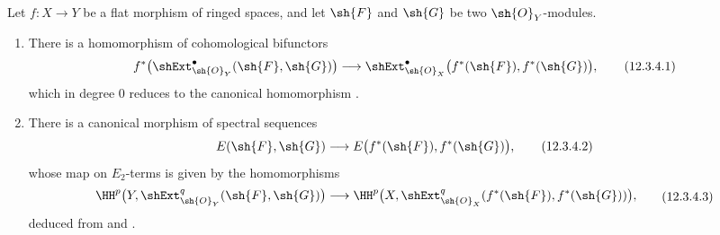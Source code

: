 \begin{proposition}[12.3.4]
\label{0.12.3.4}
Let $f:X\to Y$ be a flat morphism of ringed spaces, and let
$\sh{F}$ and $\sh{G}$ be two $\sh{O}_Y$-modules.
\begin{enumerate}
  \item[\rm(i)] There is a homomorphism of cohomological bifunctors
  \[
    f^*\bigl(\shExt^\bullet_{\sh{O}_Y}(\sh{F},\sh{G})\bigr)
    \longrightarrow
    \shExt^\bullet_{\sh{O}_X}
      \bigl(f^*(\sh{F}),f^*(\sh{G})\bigr),
    \tag{12.3.4.1}
    \label{0.12.3.4.1}
  \]
  which in degree $0$ reduces to the canonical homomorphism
  .

  \item[\rm(ii)] There is a canonical morphism of spectral sequences
  \[
    E(\sh{F},\sh{G})
    \longrightarrow E\bigl(f^*(\sh{F}),f^*(\sh{G})\bigr),
    \tag{12.3.4.2}
    \label{0.12.3.4.2}
  \]
  whose map on $E_2$-terms is given by the homomorphisms
  \[
    \begin{aligned}
    \HH^p\bigl(Y,\shExt^q_{\sh{O}_Y}(\sh{F},\sh{G})\bigr)
    \longrightarrow
    \HH^p\bigl(X,\shExt^q_{\sh{O}_X}
      (f^*(\sh{F}),f^*(\sh{G}))\bigr),
    \end{aligned}
    \tag{12.3.4.3}
    \label{0.12.3.4.3}
  \]
  deduced from  and .
\end{enumerate}
\end{proposition}

